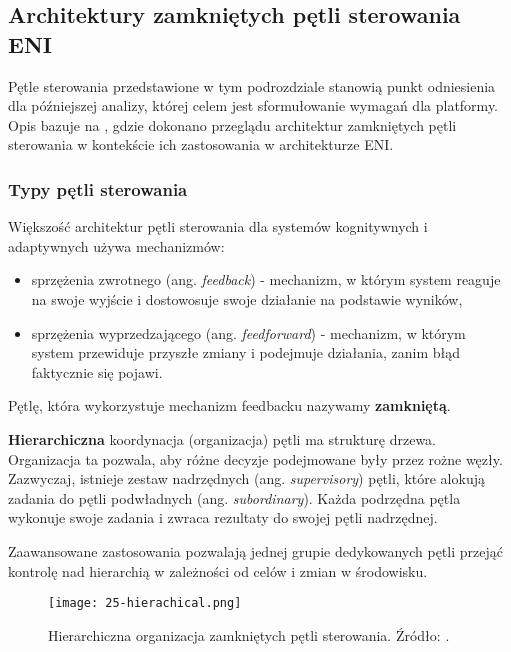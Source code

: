 \subsection{Architektury zamkniętych pętli sterowania ENI}\hypertarget{sec:25}{}\label{sec:25}

Pętle sterowania przedstawione w tym podrozdziale stanowią punkt odniesienia dla późniejszej analizy, której celem jest sformułowanie wymagań dla platformy. Opis bazuje na \cite{etsieni2024}, gdzie dokonano przeglądu architektur zamkniętych pętli sterowania w kontekście ich zastosowania w architekturze ENI.

\subsubsection{Typy pętli sterowania}

Większość architektur pętli sterowania dla systemów kognitywnych i adaptywnych używa mechanizmów:
\begin{itemize}
    \item sprzężenia zwrotnego (ang. \textit{feedback}) - mechanizm, w którym system reaguje na swoje wyjście i dostowosuje swoje działanie na podstawie wyników,
    \item sprzężenia wyprzedzającego (ang. \textit{feedforward}) - mechanizm, w którym system przewiduje przyszłe zmiany i podejmuje działania, zanim błąd faktycznie się pojawi.
\end{itemize}

Pętlę, która wykorzystuje mechanizm feedbacku nazywamy \textbf{zamkniętą}.

\textbf{Hierarchiczna} koordynacja (organizacja) pętli ma strukturę drzewa. Organizacja ta pozwala, aby różne decyzje podejmowane były przez rożne węzły. Zazwyczaj, istnieje zestaw nadrzędnych (ang. \textit{supervisory}) pętli, które alokują zadania do pętli podwładnych (ang. \textit{subordinary}). Każda podrzędna pętla wykonuje swoje zadania i zwraca rezultaty do swojej pętli nadrzędnej. 

Zaawansowane zastosowania pozwalają jednej grupie dedykowanych pętli przejąć kontrolę nad hierarchią w zależności od celów i zmian w środowisku. 


\begin{figure}[!h]
    \centering \texttt{[image: 25-hierachical.png]}
    \caption{Hierarchiczna organizacja zamkniętych pętli sterowania. Źródło: \cite{etsieni2024}.}\label{fig:25-hierachical}
\end{figure}

